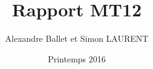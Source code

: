 \documentclass[a4paper,12pt]{report}
\begin{document}
\title{Rapport \no MT12}
\author{Alexandre Ballet et Simon LAURENT}
\date{Printemps 2016}
   
\maketitle

\tableofcontents

\end{document}
